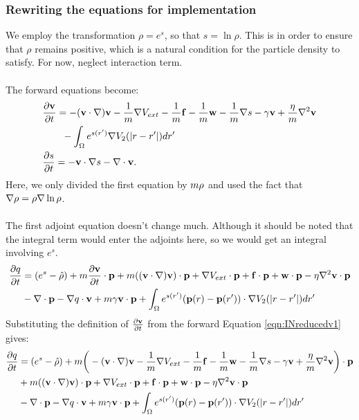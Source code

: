 \subsubsection{Rewriting the equations for implementation}
We employ the transformation $\rho = e^s$, so that $s = \ln \rho$. This is in order to ensure that $\rho$ remains positive, which is a natural condition for the particle density to satisfy. For now, neglect interaction term.
\\
\\
The forward equations become:
\begin{align}
& \frac{\partial \mathbf{v}}{\partial t}= -  (\mathbf{v} \cdot \nabla)\mathbf{v} - \frac{1}{m} \nabla V_{ext} -\frac{1}{m}\mathbf{f} -\frac{1}{m} \mathbf{w} - \frac{1}{m} \nabla s - \gamma \mathbf{v} +  \frac{\eta}{m} \nabla^2 \mathbf{v} \label{eqn:INreducedv1}\\
&\quad \quad  -\int_\Omega e^{s(r')} \nabla V_2(|r-r'|)dr'\\
 &\frac{\partial s}{\partial t} = - \mathbf{v} \cdot \nabla s - \nabla \cdot \mathbf{v} \label{eqn:INreducedrho1} .
\end{align}
Here, we only divided the first equation by $m \rho$ and used the fact that $\nabla \rho = \rho \nabla \ln \rho$.\\
\\
The first adjoint equation doesn't change much. Although it should be noted that the integral term would enter the adjoints here, so we would get an integral involving $e^s$.
\begin{align*}
 \frac{\partial q}{\partial t} &= (e^s - \hat \rho) +m  \frac{\partial \mathbf{v}}{\partial t}\cdot \mathbf{p} + m ( (\mathbf{v} \cdot \nabla)\mathbf{v}) \cdot \mathbf{p}+ \nabla V_{ext}\cdot \mathbf{p} + \mathbf{f} \cdot \mathbf{p} + \mathbf{w} \cdot \mathbf{p}  - \eta \nabla^2 \mathbf{v} \cdot \mathbf{p}\\
&-\nabla\cdot \mathbf{p}  -  \nabla q \cdot \mathbf{v} + m \gamma \mathbf{v} \cdot \mathbf{p}  + \int_\Omega  e^{s(r')}(\mathbf{p}(r) - \mathbf{p}(r')) \cdot\nabla V_2(|r-r'|)   dr' \qquad 
\end{align*}
Substituting the definition of $\frac{\partial \mathbf{v}}{\partial t}$ from the forward Equation \ref{eqn:INreducedv1} gives:
\begin{align*}
 \frac{\partial q}{\partial t} &= (e^s - \hat \rho) +m  \bigg( -  (\mathbf{v} \cdot \nabla)\mathbf{v} - \frac{1}{m} \nabla V_{ext} -\frac{1}{m}\mathbf{f} -\frac{1}{m} \mathbf{w} - \frac{1}{m} \nabla s - \gamma \mathbf{v} +  \frac{\eta}{m} \nabla^2 \mathbf{v}\bigg)\cdot \mathbf{p} \\
&+ m ( (\mathbf{v} \cdot \nabla)\mathbf{v}) \cdot \mathbf{p}+ \nabla V_{ext}\cdot \mathbf{p} + \mathbf{f} \cdot \mathbf{p} + \mathbf{w} \cdot \mathbf{p}  - \eta \nabla^2 \mathbf{v} \cdot \mathbf{p} \\
&-\nabla\cdot \mathbf{p}  -  \nabla q \cdot \mathbf{v} + m \gamma \mathbf{v} \cdot \mathbf{p}   + \int_\Omega  e^{s(r')}(\mathbf{p}(r) - \mathbf{p}(r')) \cdot\nabla V_2(|r-r'|)   dr'
\end{align*}
